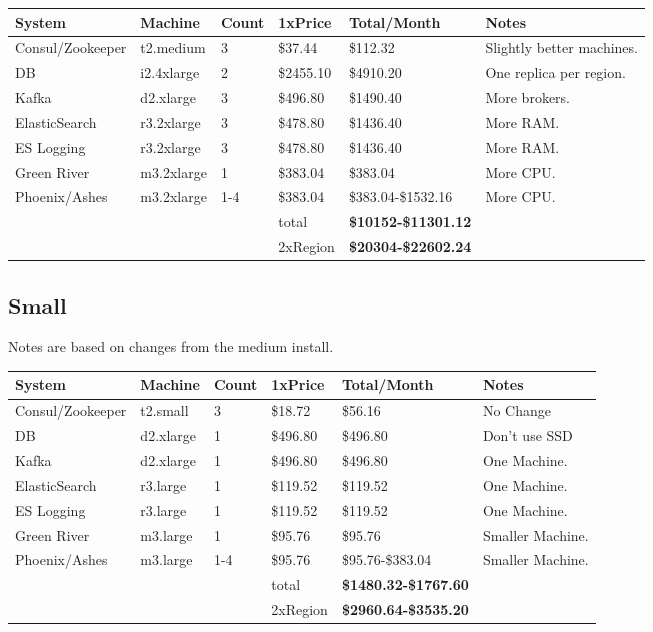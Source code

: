 \documentclass[11pt]{article}
\begin{document}
\begin{center}
    \begin{tabular}{| l l l l | l | p{3cm} |}
        \hline
        System & Machine & Count & 1xPrice & Total/Month & Notes \\
        \hline \hline
        Consul/Zookeeper & t2.medium & 3 & \$37.44 & \$112.32 & Slightly better machines.\\ \hline
        DB & i2.4xlarge & 2 & \$2455.10 & \$4910.20 & One replica per region.\\ \hline
        Kafka & d2.xlarge & 3 & \$496.80 & \$1490.40 & More brokers.\\ \hline
        ElasticSearch & r3.2xlarge & 3 & \$478.80 & \$1436.40 & More RAM.\\ \hline
        ES Logging & r3.2xlarge & 3 & \$478.80 & \$1436.40 & More RAM.\\ \hline
        Green River & m3.2xlarge & 1 & \$383.04 & \$383.04 & More CPU.\\ \hline
        Phoenix/Ashes & m3.2xlarge & 1-4 & \$383.04 & \$383.04-\$1532.16 & More CPU.\\ \hline
        & & & total & {\bf \$10152-\$11301.12} & \\ \hline
        & & & 2xRegion & {\bf \$20304-\$22602.24} & \\ \hline
    \end{tabular}
\end{center}

\subsection{Small}

Notes are based on changes from the medium install.

\begin{center}
    \begin{tabular}{| l l l l | l | p{3cm} |}
        \hline
        System & Machine & Count & 1xPrice & Total/Month & Notes \\
        \hline \hline
        Consul/Zookeeper & t2.small & 3 & \$18.72 & \$56.16 & No Change\\ \hline
        DB & d2.xlarge & 1 & \$496.80 & \$496.80 & Don't use SSD\\ \hline
        Kafka & d2.xlarge & 1 & \$496.80 & \$496.80 & One Machine.\\ \hline
        ElasticSearch & r3.large & 1 & \$119.52 & \$119.52 & One Machine.\\ \hline
        ES Logging & r3.large & 1 & \$119.52 & \$119.52 & One Machine.\\ \hline
        Green River & m3.large & 1 & \$95.76 & \$95.76 & Smaller Machine.\\ \hline
        Phoenix/Ashes & m3.large & 1-4 & \$95.76 & \$95.76-\$383.04 & Smaller Machine.\\ \hline
        & & & total & {\bf \$1480.32-\$1767.60} & \\ \hline
        & & & 2xRegion & {\bf \$2960.64-\$3535.20} & \\ \hline
    \end{tabular}
\end{center}
\end{document}

